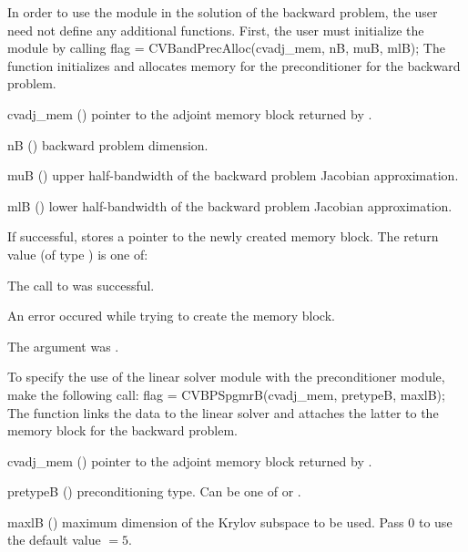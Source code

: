 In order to use the {\cvbandpre} module in the solution of the backward problem,
the user need not define any additional functions. First, the user must initialize the
{\cvbandpre} module by calling
{
  flag = CVBandPrecAlloc(cvadj\_mem, nB, muB, mlB);
}
{
  The function  initializes and allocates
  memory for the {\cvbandpre} preconditioner for the backward problem.
}
{
  \begin{args}
  \item[cvadj\_mem] ()
    pointer to the adjoint memory block returned by .
  \item[nB] ()
    backward problem dimension.
  \item[muB] ()
    upper half-bandwidth of the backward problem Jacobian approximation.
  \item[mlB] ()
    lower half-bandwidth of the backward problem Jacobian approximation.
  \end{args}
}
{
  If successful,  stores a pointer to the newly created 
  {\cvbandpre} memory block.
  The return value  (of type ) is one of:
  \begin{args}
  \item[\Id{CV\_SUCCESS}]
    The call to  was successful.
  \item[\Id{CV\_PDATA\_NULL}]
    An error occured while trying to create the {\cvbandpre} memory block.
  \item[\Id{CV\_ADJMEM\_NULL}]
    The  argument was .
  \end{args}
}
{}
To specify the use of the {\cvspgmr} linear solver module with the {\cvbandpre} 
preconditioner module, make the following call:
{
  flag = CVBPSpgmrB(cvadj\_mem, pretypeB, maxlB);
}
{
  The function  links the {\cvbandpre} data to the
  {\cvspgmr} linear solver and attaches the latter to the {\cvodes}
  memory block for the backward problem.
}
{
  \begin{args}
  \item[cvadj\_mem] ()
    pointer to the adjoint memory block returned by .
  \item[pretypeB] ()
    preconditioning type. Can be one of  or .
  \item[maxlB] ()
    maximum dimension of the Krylov subspace to be used. Pass $0$ to use the 
    default value $=5$.
  \end{args}
}

